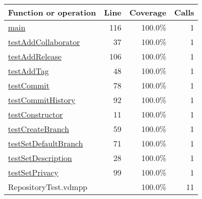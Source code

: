 \begin{longtable}{|l|r|r|r|}
\hline
Function or operation & Line & Coverage & Calls \\
\hline
\hline
\hyperref[main:116]{main} & 116&100.0\% & 1 \\
\hline
\hyperref[testAddCollaborator:37]{testAddCollaborator} & 37&100.0\% & 1 \\
\hline
\hyperref[testAddRelease:106]{testAddRelease} & 106&100.0\% & 1 \\
\hline
\hyperref[testAddTag:48]{testAddTag} & 48&100.0\% & 1 \\
\hline
\hyperref[testCommit:78]{testCommit} & 78&100.0\% & 1 \\
\hline
\hyperref[testCommitHistory:92]{testCommitHistory} & 92&100.0\% & 1 \\
\hline
\hyperref[testConstructor:11]{testConstructor} & 11&100.0\% & 1 \\
\hline
\hyperref[testCreateBranch:59]{testCreateBranch} & 59&100.0\% & 1 \\
\hline
\hyperref[testSetDefaultBranch:71]{testSetDefaultBranch} & 71&100.0\% & 1 \\
\hline
\hyperref[testSetDescription:28]{testSetDescription} & 28&100.0\% & 1 \\
\hline
\hyperref[testSetPrivacy:99]{testSetPrivacy} & 99&100.0\% & 1 \\
\hline
\hline
RepositoryTest.vdmpp & & 100.0\% & 11 \\
\hline
\end{longtable}

